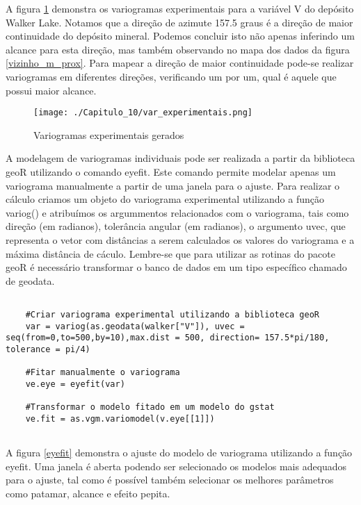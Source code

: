 A figura \ref{variogramas_experimentais} demonstra os variogramas experimentais para a variável V do depósito Walker Lake. Notamos que a direção de azimute 157.5 graus é a direção de maior continuidade do depósito mineral. Podemos concluir isto não apenas inferindo um alcance para esta direção, mas também observando no mapa dos dados da figura \ref{vizinho_m_prox}. Para mapear a direção de maior continuidade pode-se realizar variogramas em diferentes direções, verificando um por um, qual é aquele que possui maior alcance.

\FloatBarrier
\begin{figure}[H]
	\centering
	\texttt{[image: ./Capitulo\_10/var\_experimentais.png]}	
	\caption{Variogramas experimentais gerados}
	\label{variogramas_experimentais}
\end{figure}
\FloatBarrier

A modelagem de variogramas individuais pode ser realizada a partir da biblioteca geoR utilizando o comando eyefit. Este comando permite modelar apenas um variograma manualmente a partir de uma janela para o ajuste. Para realizar o cálculo criamos um objeto do variograma experimental utilizando a função variog() e atribuímos os argummentos relacionados com o variograma, tais como direção (em radianos), tolerância angular (em radianos), o argumento uvec, que representa o vetor com distâncias a serem calculados os valores do variograma e a máxima distância de cáculo. Lembre-se que para utilizar as rotinas do pacote geoR é necessário transformar o banco de dados em um tipo específico chamado de geodata. 

\begin{scriptsize}
	\estiloR
	\begin{lstlisting}[]
	
	#Criar variograma experimental utilizando a biblioteca geoR
	var = variog(as.geodata(walker["V"]), uvec = seq(from=0,to=500,by=10),max.dist = 500, direction= 157.5*pi/180, tolerance = pi/4)
	
	#Fitar manualmente o variograma  
	ve.eye = eyefit(var)
	
	#Transformar o modelo fitado em um modelo do gstat
	ve.fit = as.vgm.variomodel(v.eye[[1]])
	
	\end{lstlisting}
\end{scriptsize}

A figura \ref{eyefit} demonstra o ajuste do modelo de variograma utilizando a função eyefit. Uma janela é aberta podendo ser selecionado os modelos mais adequados para o ajuste, tal como é possível também selecionar os melhores parâmetros como patamar, alcance e efeito pepita.

